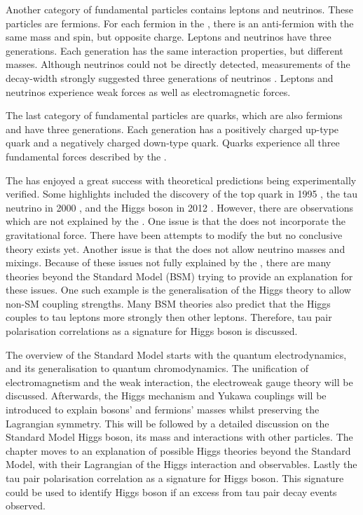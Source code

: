 Another category of fundamental particles contains leptons and neutrinos. These particles are fermions. For each fermion in the \SM, there is an anti-fermion with the same mass and spin, but opposite charge. Leptons and neutrinos have three generations. Each generation has the same interaction properties, but different masses. Although neutrinos could not be directly detected, measurements of the \PZ decay-width strongly suggested three generations of neutrinos \cite{ALEPH:2005ab}. Leptons and neutrinos experience weak forces as well as electromagnetic forces.

The last category of fundamental particles are quarks, which are also fermions and have three generations. Each generation has a positively charged up-type quark and a negatively charged down-type quark. Quarks experience all three fundamental forces described by the \SM.

The \SM has enjoyed a great success with theoretical predictions being experimentally verified. Some highlights included the discovery of the top quark in 1995 \cite{Abachi:1995iq}, the tau neutrino in 2000 \cite{Kodama:2000mp}, and the Higgs boson in 2012 \cite{Aad:2012tfa}. However, there are observations which are not explained by the \SM. One issue is that the \SM does not incorporate the gravitational force. There have been attempts to modify the \SM but no conclusive theory exists yet. Another issue is that the \SM does not allow neutrino masses and mixings. Because of these issues not fully explained by the \SM, there are many theories beyond the Standard Model (BSM) trying to provide an explanation for these issues. One such example is the generalisation of the Higgs theory to allow non-SM coupling strengths. Many BSM theories also predict that the Higgs couples to tau leptons more strongly then other leptons. Therefore, tau pair polarisation correlations as a signature for Higgs boson is discussed.

The overview of the Standard Model starts with the quantum electrodynamics, and its generalisation to quantum chromodynamics. The unification of electromagnetism and the weak interaction, the electroweak gauge theory will be discussed. Afterwards, the Higgs mechanism and Yukawa couplings will be introduced to explain bosons' and fermions' masses whilst preserving the Lagrangian symmetry. This will be followed by a detailed discussion on the Standard Model Higgs boson, its mass and interactions with other particles. The chapter moves to an explanation of possible Higgs theories beyond the Standard Model, with their  Lagrangian of the Higgs interaction and observables. Lastly the tau pair polarisation correlation as a signature for Higgs boson. This signature could be used to identify Higgs boson if an excess from tau pair decay events observed.


